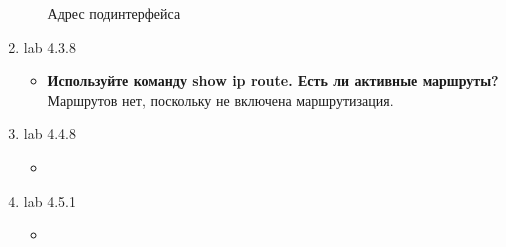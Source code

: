 \documentclass[a4paper,14pt]{extarticle}
\begin{document}
\begin{enumerate}
\begin{itemize}
                Адрес подинтерфейса
        \end{itemize}
        \item lab 4.3.8
        \begin{itemize}
            \item \textbf{Используйте команду show ip route. Есть ли активные маршруты?}
                Маршрутов нет, поскольку не включена маршрутизация.
        \end{itemize}
        \item lab 4.4.8
        \begin{itemize}
            \item 
        \end{itemize}
        \item lab 4.5.1
        \begin{itemize}
            \item 
        \end{itemize}
    \end{enumerate}
\end{document}
